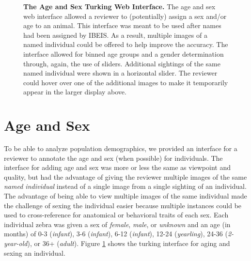 \begin{figure}[t]%
    \centering
        \caption[The Age and Sex Turking Web Interface]{\textbf{The Age and Sex Turking Web Interface.}  The age and sex web interface allowed a reviewer to (potentially) assign a sex and/or age to an animal.  This interface was meant to be used after names had been assigned by IBEIS.  As a result, multiple images of a named individual could be offered to help improve the accuracy.  The interface allowed for binned age groups and a gender determination through, again, the use of sliders.  Additional sightings of the same named individual were shown in a horizontal slider.  The reviewer could hover over one of the additional images to make it temporarily appear in the larger display above.}
        \label{fig:turking_interface_metadata}
\end{figure}

\section{Age and Sex}
To be able to analyze population demographics, we provided an interface for a reviewer to annotate the age and sex (when possible) for individuals.  The interface for adding age and sex was more or less the same as viewpoint and quality, but had the advantage of giving the reviewer multiple images of the same \textit{named individual} instead of a single image from a single sighting of an individual.  The advantage of being able to view multiple images of the same individual made the challenge of sexing the individual easier because multiple instances could be used to cross-reference for anatomical or behavioral traits of each sex.  Each individual zebra was given a sex of \textit{female}, \textit{male}, or \textit{unknown} and an age (in months) of 0-3 (\textit{infant}), 3-6 (\textit{infant}), 6-12 (\textit{infant}), 12-24 (\textit{yearling}), 24-36 (\textit{2-year-old}), or 36+ (\textit{adult}).  Figure
\ref{fig:turking_interface_metadata} shows the turking interface for aging and sexing an individual.

